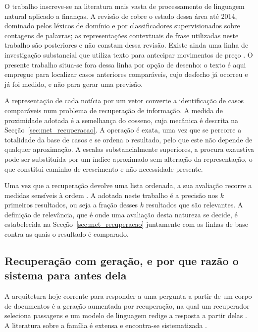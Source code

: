 O trabalho inscreve-se na literatura mais vasta de processamento de linguagem natural aplicado a
finanças. A revisão de \textcite{kearney2014textual} cobre o estado dessa área até 2014, dominado
pelos léxicos de domínio e por classificadores supervisionados sobre contagens de palavras; as
representações contextuais de frase utilizadas neste trabalho são posteriores e não constam dessa
revisão. Existe ainda uma linha de investigação substancial que utiliza texto para antecipar
movimentos de preço \autocite{xing2018nlffsurvey, ding2015deep}. O presente trabalho situa-se fora
dessa linha por opção de desenho: o texto é aqui empregue para localizar casos anteriores
comparáveis, cujo desfecho já ocorreu e já foi medido, e não para gerar uma previsão.

A representação de cada notícia por um vetor converte a identificação de casos comparáveis num
problema de recuperação de informação. A medida de proximidade adotada é a semelhança do cosseno,
cuja mecânica é descrita na Secção~\ref{sec:met_recuperacao}. A operação é exata, uma vez que se
percorre a totalidade da base de casos e se ordena o resultado, pelo que este não depende de
qualquer aproximação. A escalas substancialmente superiores, a procura exaustiva pode ser
substituída por um índice aproximado \autocite{johnson2021faiss} sem alteração da representação, o
que constitui caminho de crescimento e não necessidade presente.

Uma vez que a recuperação devolve uma lista ordenada, a sua avaliação recorre a medidas sensíveis à
ordem \autocite{manning2008ir}. A adotada neste trabalho é a precisão nos $k$ primeiros resultados,
ou seja a fração desses $k$ resultados que são relevantes. A definição de relevância, que é onde uma
avaliação desta natureza se decide, é estabelecida na Secção~\ref{sec:met_recuperacao} juntamente
com as linhas de base contra as quais o resultado é comparado.

\subsection{Recuperação com geração, e por que razão o sistema para antes dela}

A arquitetura hoje corrente para responder a uma pergunta a partir de um corpo de documentos é a
geração aumentada por recuperação, na qual um recuperador seleciona passagens e um modelo de
linguagem redige a resposta a partir delas \autocite{lewis2020rag}. A literatura sobre a família é
extensa e encontra-se sistematizada \autocite{huang2026ragsurvey}.

